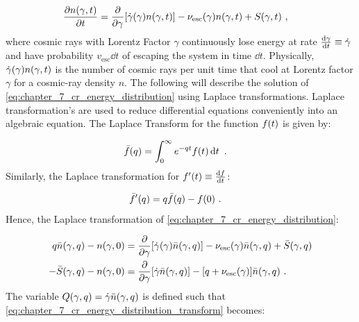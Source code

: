 \begin{equation}
    \begin{aligned}
    \pdv{n\qty(\gamma,t)}{t}&=\pdv{ }{\gamma}\qty[\dot{\gamma}\qty(\gamma)n\qty(\gamma, t)] - \nu_\text{esc}\qty(\gamma)n\qty(\gamma,t) + S\qty(\gamma, t)\text{ ,}
    \end{aligned} \label{eq:chapter_7_cr_energy_distribution}
\end{equation}
\noindent where cosmic rays with Lorentz Factor $\gamma$ continuously lose energy at rate $\dv{\gamma}{t}\equiv \dot{\gamma}$ and have probability $v_\text{esc}\dd{t}$ of escaping the system in time $\dd{t}$. Physically, $\dot{\gamma}\qty(\gamma)n\qty(\gamma,t)$ is the number of cosmic rays per unit time that cool at Lorentz factor $\gamma$ for a cosmic-ray density $n$. The following will describe the solution of \autoref{eq:chapter_7_cr_energy_distribution} using Laplace transformations.
\newpar
Laplace transformation's are used to reduce differential equations conveniently into an algebraic equation. The Laplace Transform for the function $f\qty(t)$ is given by:

\begin{equation}
    \begin{aligned}
        \bar{f}\qty(q)&=\int_0^\infty e^{-qt}f\qty(t)\dd{t}\text{ .}
    \end{aligned}
\end{equation}
\noindent Similarly, the Laplace transformation for $f'\qty(t)\equiv \dv{f}{t}$:

\begin{equation}
	\begin{aligned}
		\bar{f}'\qty(q)&=q\bar{f}\qty(q)-f\qty(0)\text{ .}
	\end{aligned}
\end{equation}
\noindent Hence, the Laplace transformation of \autoref{eq:chapter_7_cr_energy_distribution}:

\begin{equation}
    \begin{aligned}
        q\bar{n}\qty(\gamma, q)-n\qty(\gamma,0)&=\pdv{}{\gamma}\qty[\dot{\gamma}\qty(\gamma)\bar{n}\qty(\gamma, q)] - \nu_\text{esc}\qty(\gamma)\bar{n}\qty(\gamma,q) + \bar{S}\qty(\gamma, q) \\
        -\bar{S}\qty(\gamma,q)-n\qty(\gamma,0)&=\pdv{}{\gamma}\qty[\dot{\gamma}\bar{n}\qty(\gamma,q)]-\qty[q+\nu_\text{esc}\qty(\gamma)]\bar{n}\qty(\gamma,q)\text{ .}
    \end{aligned} \label{eq:chapter_7_cr_energy_distribution_transform}
\end{equation}
\noindent The variable $Q\qty(\gamma,q)=\dot{\gamma}\bar{n}\qty(\gamma,q)$ is defined such that \autoref{eq:chapter_7_cr_energy_distribution_transform} becomes:

